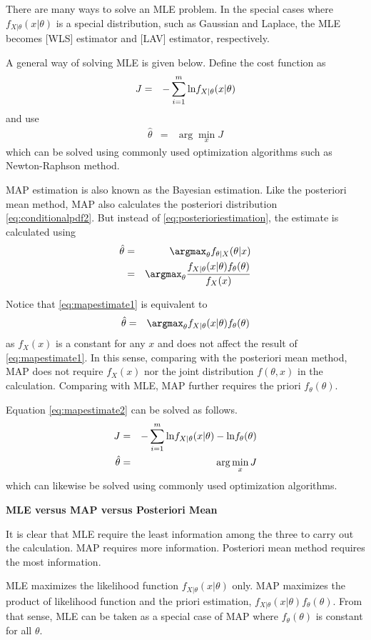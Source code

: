 There are many ways to solve an MLE problem. In the special cases where $f_{X|\theta}(x|\theta)$ is a special distribution, such as Gaussian and Laplace, the MLE becomes [WLS] estimator and [LAV] estimator, respectively.

A general way of solving MLE is given below. Define the cost function as
\begin{eqnarray}
	J &=& -\sum_{i=1}^{m}\textup{ln}f_{X|\theta}(x|\theta) \nonumber 	
\end{eqnarray}
and use 
\begin{eqnarray}
\hat{\theta} &=& \arg\min_{x} J \nonumber
\end{eqnarray}
which can be solved using commonly used optimization algorithms such as Newton-Raphson method.

MAP estimation is also known as the Bayesian estimation. Like the posteriori mean method, MAP also calculates the posteriori distribution \eqref{eq:conditionalpdf2}. But instead of \eqref{eq:posterioriestimation}, the estimate is calculated using
\begin{eqnarray}
	\hat{\theta} &=& \argmax_\theta f_{\theta|X}(\theta|x) \nonumber \\
	&=&  \argmax_\theta \dfrac{f_{X|\theta}(x|\theta)f_\theta(\theta)}{f_X(x)} \label{eq:mapestimate1}
\end{eqnarray}

Notice that \eqref{eq:mapestimate1} is equivalent to
\begin{eqnarray}
	\hat{\theta} &=& \argmax_\theta f_{X|\theta}(x|\theta)f_\theta(\theta) \label{eq:mapestimate2}
\end{eqnarray}
as $f_X(x)$ is a constant for any $x$ and does not affect the result of \eqref{eq:mapestimate1}. In this sense, comparing with the posteriori mean method, MAP does not require $f_X(x)$ nor the joint distribution $f(\theta, x)$ in the calculation. Comparing with MLE, MAP further requires the priori $f_\theta(\theta)$.

Equation \eqref{eq:mapestimate2} can be solved as follows.
\begin{eqnarray}
	J &=& -\sum_{i=1}^{m}\textup{ln}f_{X|\theta}(x|\theta) - \textup{ln}f_\theta(\theta) \nonumber \\
	\hat{\theta} &=& \arg\min_{x} J \nonumber
\end{eqnarray}
which can likewise be solved using commonly used optimization algorithms.

\begin{mdframed}
	\noindent \textbf{MLE versus MAP versus Posteriori Mean}
	
	It is clear that MLE require the least information among the three to carry out the calculation. MAP requires more information. Posteriori mean method requires the most information.
	
	MLE maximizes the likelihood function $f_{X|\theta}(x|\theta)$ only. MAP maximizes the product of likelihood function and the priori estimation, $f_{X|\theta}(x|\theta)f_\theta(\theta)$. From that sense, MLE can be taken as a special case of MAP where $f_\theta(\theta)$ is constant for all $\theta$.
	
\end{mdframed}

